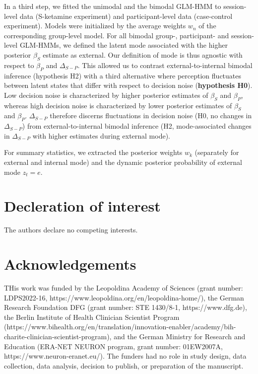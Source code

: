 \documentclass[
]{article}
\begin{document}
In a third step, we fitted the unimodal and the bimodal GLM-HMM to
session-level data (S-ketamine experiment) and participant-level data
(case-control experiment). Models were initialized by the average
weights \(w_n\) of the corresponding group-level model. For all bimodal
group-, participant- and session-level GLM-HMMs, we defined the latent
mode associated with the higher posterior \(\beta_S\) estimate as
external. Our definition of mode is thus agnostic with respect to
\(\beta_P\) and \(\Delta_{S-P}\). This allowed us to contrast
external-to-internal bimodal inference (hypothesis H2) with a third
alternative where perception fluctuates between latent states that
differ with respect to decision noise (\textbf{hypothesis H0}). Low
decision noise is characterized by higher posterior estimates of
\(\beta_S\) and \(\beta_P\), whereas high decision noise is
characterized by lower posterior estimates of \(\beta_S\) and
\(\beta_P\). \(\Delta_{S-P}\) therefore discerns fluctuations in
decision noise (H0, no changes in \(\Delta_{S-P}\)) from
external-to-internal bimodal inference (H2, mode-associated changes in
\(\Delta_{S-P}\) with higher estimates during external mode).

For summary statistics, we extracted the posterior weights \(w_k\)
(separately for external and internal mode) and the dynamic posterior
probability of external mode \(z_t = e\).

\newpage
\hypertarget{decleration}{%
\section{Decleration of interest}\label{decleration}}

The authors declare no competing interests.

\hypertarget{acknowledgements}{%
\section{Acknowledgements}\label{acknowledgements}}

THis work was funded by the Leopoldina Academy of Sciences (grant number: LDPS2022-16, https://www.leopoldina.org/en/leopoldina-home/), the German Research Foundation DFG (grant number: STE 1430/8-1, https://www.dfg.de), the Berlin Institute of Health Clinician Scientist Program (https://www.bihealth.org/en/translation/innovation-enabler/academy/bih-charite-clinician-scientist-program), and the German Ministry for Research and Education (ERA-NET NEURON program, grant number: 01EW2007A, https://www.neuron-eranet.eu/). The funders had no role in study design, data collection, data analysis, decision to publish, or preparation of the manuscript.
\end{document}

